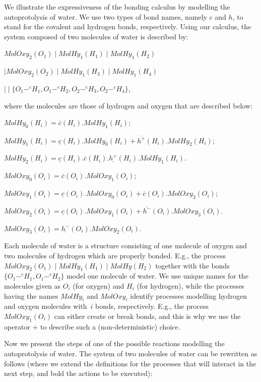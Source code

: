 \documentclass[runningheads]{llncs}
\newcommand{\MolOxy}{\mathit{MolOxy}}
\newcommand{\MolHy}{\mathit{MolHy}}
\begin{document}
\begin{example}
We illustrate the expressiveness of the bonding calculus by modelling the 
autoprotolysis of water. We use two types of bond names, namely $c$ and $h$, 
to stand for the covalent and hydrogen bonds, respectively. Using our  
calculus, the system composed of two molecules of water is described by:

\centerline{$\MolOxy_2(O_1) \mid \MolHy_1(H_1) \mid \MolHy_1(H_2) $}

\centerline{$\mid \MolOxy_2(O_2) \mid \MolHy_1(H_3) \mid \MolHy_1(H_4) $}

\centerline{$\mid\mid \{O_1 -^c H_1, O_1 -^c H_2, O_2 -^c H_3, O_2 -^c H_4\}$,}

\noindent 
where the molecules are those of hydrogen and oxygen that are described below:

$\MolHy_0(H_i) = \overline{c}(H_i).\MolHy_1(H_i)$;

$\MolHy_1(H_i) = \underline{c}(H_i).\MolHy_0(H_i) + \overline{h^+}(H_i).\MolHy_2(H_i)$;

$\MolHy_2(H_i) = \underline{c}(H_i).\overline{c}(H_i).\underline{h^+}(H_i).\MolHy_{1}(H_i)$.

$\MolOxy_0(O_i) = \overline{c}(O_i).\MolOxy_1(O_i)$;

$\MolOxy_1(O_i) = \underline{c}(O_i).\MolOxy_0(O_i) +\overline{c}(O_i).\MolOxy_2(O_i)$;

$\MolOxy_2(O_i) = \underline{c}(O_i).\MolOxy_1(O_i) +\overline{h^-}(O_i).\MolOxy_3(O_i)$.

$\MolOxy_3(O_i) = \underline{h^-}(O_i).\MolOxy_2(O_i)$.

\noindent 
Each molecule of water is a structure consisting of one molecule of oxygen 
and two molecules of hydrogen which are properly bonded. E.g., the process 
$\MolOxy_2(O_1) \mid \MolHy_1(H_1) \mid \MolHy(H_2) $ together with the 
bonds $\{O_1 -^c H_1, O_1 -^c H_2\}$ model one molecule of water. We use 
unique names for the molecules given as $O_i$ (for oxygen) and $H_i$ (for 
hydrogen), while the processes having the names $\MolHy_i$ and $\MolOxy_i$ 
identify processes modelling hydrogen and oxygen molecules with~$i$ bonds, 
respectively. E.g., the process $MolOxy_1(O_i)$ can either create or break 
bonds, and this is why we use the operator $+$ to describe such a  
(non-deterministic) choice.

Now we present the steps of one of the possible reactions modelling the 
autoprotolysis of water. The system of two molecules of water can be 
rewritten as follows (where we extend the definitions for the processes 
that will interact in the next step, and bold the actions to be executed):\\


\end{example}
\end{document}
